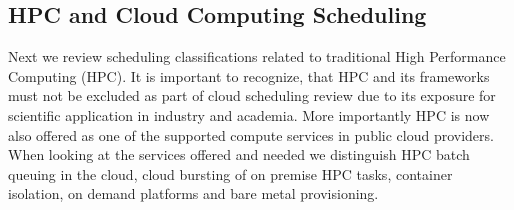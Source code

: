 \documentclass[final,5p,times,twocolumn]{elsarticle}
\begin{document}
%



\subsection{HPC and Cloud Computing Scheduling}
\label{sec:hpc}


Next we review scheduling classifications related to traditional High
Performance Computing (HPC). It is important to recognize, that HPC
and its frameworks must not be excluded as part of cloud scheduling review
due to its exposure for scientific application in industry and
academia. More importantly HPC is now also offered as one of the supported
compute services in public cloud providers. When looking at the services offered
and needed we distinguish HPC batch queuing in the cloud, cloud
bursting of on premise HPC tasks, container isolation, on demand
platforms and bare metal provisioning.
\end{document}
